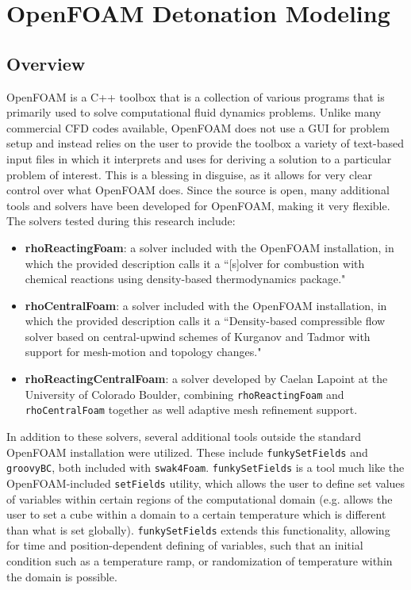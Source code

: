 \chapter{OpenFOAM Detonation Modeling}
\label{ofchap}


\section{Overview}
OpenFOAM is a C++ toolbox that is a collection of various programs that is primarily used to solve computational fluid dynamics problems. Unlike many commercial CFD codes available, OpenFOAM does not use a GUI for problem setup and instead relies on the user to provide the toolbox a variety of text-based input files in which it interprets and uses for deriving a solution to a particular problem of interest. This is a blessing in disguise, as it allows for very clear control over what OpenFOAM does. Since the source is open, many additional tools and solvers have been developed for OpenFOAM, making it very flexible. The solvers tested during this research include:
\begin{itemize}
    \item \textbf{rhoReactingFoam}: a solver included with the OpenFOAM installation, in which the provided description calls it a ``[s]olver for combustion with chemical reactions using density-based thermodynamics package."
    \item \textbf{rhoCentralFoam}: a solver included with the OpenFOAM installation, in which the provided description calls it a ``Density-based compressible flow solver based on central-upwind schemes of Kurganov and Tadmor with support for mesh-motion and topology changes."
    \item \textbf{rhoReactingCentralFoam}: a solver developed by Caelan Lapoint at the University of Colorado Boulder, combining \verb|rhoReactingFoam| and \verb|rhoCentralFoam| together as well adaptive mesh refinement support. 
\end{itemize}

In addition to these solvers, several additional tools outside the standard OpenFOAM installation were utilized. These include \verb|funkySetFields| and \verb|groovyBC|, both included with \verb|swak4Foam|. \verb|funkySetFields| is a tool much like the OpenFOAM-included \verb|setFields| utility, which allows the user to define set values of variables within certain regions of the computational domain (e.g. allows the user to set a cube within a domain to a certain temperature which is different than what is set globally). \verb|funkySetFields| extends this functionality, allowing for time and position-dependent defining of variables, such that an initial condition such as a temperature ramp, or randomization of temperature within the domain is possible. 


